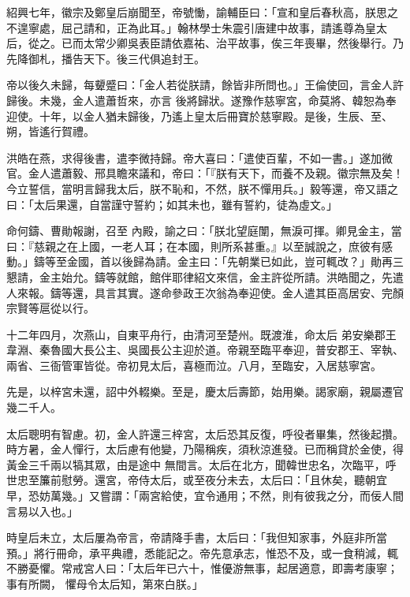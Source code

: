 \begin{pinyinscope}
 紹興七年，徽宗及鄭皇后崩聞至，帝號慟，諭輔臣曰：「宣和皇后春秋高，朕思之不遑寧處，屈己請和，正為此耳。」翰林學士朱震引唐建中故事，請遙尊為皇太后，從之。已而太常少卿吳表臣請依嘉祐、治平故事，俟三年喪畢，然後舉行。乃先降御札，播告天下。後三代俱追封王。



 帝以後久未歸，每顰蹙曰：「金人若從朕請，餘皆非所問也。」王倫使回，言金人許歸後。未幾，金人遣蕭哲來，亦言
 後將歸狀。遂豫作慈寧宮，命莫將、韓恕為奉迎使。十年，以金人猶未歸後，乃遙上皇太后冊寶於慈寧殿。是後，生辰、至、朔，皆遙行賀禮。



 洪皓在燕，求得後書，遣李微持歸。帝大喜曰：「遣使百輩，不如一書。」遂加微官。金人遣蕭毅、邢具瞻來議和，帝曰：「『朕有天下，而養不及親。徽宗無及矣！今立誓信，當明言歸我太后，朕不恥和，不然，朕不憚用兵。」毅等還，帝又語之曰：「太后果還，自當謹守誓約；如其未也，雖有誓約，徒為虛文。」



 命何鑄、曹勛報謝，召至
 內殿，諭之曰：「朕北望庭闈，無淚可揮。卿見金主，當曰：『慈親之在上國，一老人耳；在本國，則所系甚重。』以至誠說之，庶彼有感動。」鑄等至金國，首以後歸為請。金主曰：「先朝業已如此，豈可輒改？」勛再三懇請，金主始允。鑄等就館，館伴耶律紹文來信，金主許從所請。洪皓聞之，先遣人來報。鑄等還，具言其實。遂命參政王次翁為奉迎使。金人遣其臣高居安、完顏宗賢等扈從以行。



 十二年四月，次燕山，自東平舟行，由清河至楚州。既渡淮，命太后
 弟安樂郡王韋淵、秦魯國大長公主、吳國長公主迎於道。帝親至臨平奉迎，普安郡王、宰執、兩省、三衙管軍皆從。帝初見太后，喜極而泣。八月，至臨安，入居慈寧宮。



 先是，以梓宮未還，詔中外輟樂。至是，慶太后壽節，始用樂。謁家廟，親屬遷官幾二千人。



 太后聰明有智慮。初，金人許還三梓宮，太后恐其反復，呼役者畢集，然後起攢。時方暑，金人憚行，太后慮有他變，乃陽稱疾，須秋涼進發。已而稱貸於金使，得黃金三千兩以犒其眾，由是途中
 無間言。太后在北方，聞韓世忠名，次臨平，呼世忠至簾前慰勞。還宮，帝侍太后，或至夜分未去，太后曰：「且休矣，聽朝宜早，恐妨萬幾。」又嘗謂：「兩宮給使，宜令通用；不然，則有彼我之分，而佞人間言易以入也。」



 時皇后未立，太后屢為帝言，帝請降手書，太后曰：「我但知家事，外庭非所當預。」將行冊命，承平典禮，悉能記之。帝先意承志，惟恐不及，或一食稍減，輒不勝憂懼。常戒宮人曰：「太后年已六十，惟優游無事，起居適意，即壽考康寧；事有所闕，
 懼母令太后知，第來白朕。」




\end{pinyinscope}
